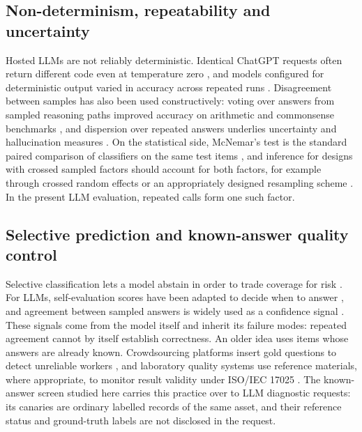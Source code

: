 \documentclass[11pt,a4paper]{article}
\begin{document}
\subsection{Non-determinism, repeatability and uncertainty}
Hosted LLMs are not reliably deterministic. Identical ChatGPT requests often return different code even at temperature zero \citep{ouyang2025nondeterminism}, and models configured for deterministic output varied in accuracy across repeated runs \citep{atil2025nondeterminism}. Disagreement between samples has also been used constructively: voting over answers from sampled reasoning paths improved accuracy on arithmetic and commonsense benchmarks \citep{wang2023selfconsistency}, and dispersion over repeated answers underlies uncertainty and hallucination measures \citep{kuhn2023semantic,xiong2024uncertainty,manakul2023selfcheckgpt}. On the statistical side, McNemar's test is the standard paired comparison of classifiers on the same test items \citep{dietterich1998approximate}, and inference for designs with crossed sampled factors should account for both factors, for example through crossed random effects or an appropriately designed resampling scheme \citep{baayen2008mixed,bates2015lme4,owen2007pigeonhole}. In the present LLM evaluation, repeated calls form one such factor.

\subsection{Selective prediction and known-answer quality control}
Selective classification lets a model abstain in order to trade coverage for risk \citep{geifman2017selective}. For LLMs, self-evaluation scores have been adapted to decide when to answer \citep{chen2023aspire}, and agreement between sampled answers is widely used as a confidence signal \citep{wang2023selfconsistency,xiong2024uncertainty,manakul2023selfcheckgpt}. These signals come from the model itself and inherit its failure modes: repeated agreement cannot by itself establish correctness. An older idea uses items whose answers are already known. Crowdsourcing platforms insert gold questions to detect unreliable workers \citep{oleson2011programmatic}, and laboratory quality systems use reference materials, where appropriate, to monitor result validity under ISO/IEC 17025 \citep{iso17025,nata2018gap}. The known-answer screen studied here carries this practice over to LLM diagnostic requests: its canaries are ordinary labelled records of the same asset, and their reference status and ground-truth labels are not disclosed in the request.
\end{document}
